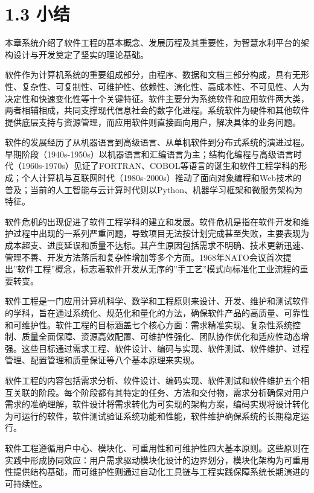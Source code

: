 \documentclass[12pt,a4paper]{ctexbook}
\begin{document}
\section{1.3 小结}\label{ux5c0fux7ed3}

本章系统介绍了软件工程的基本概念、发展历程及其重要性，为智慧水利平台的架构设计与开发奠定了坚实的理论基础。

软件作为计算机系统的重要组成部分，由程序、数据和文档三部分构成，具有无形性、复杂性、可复制性、可维护性、依赖性、演化性、高成本性、不可见性、人为决定性和快速变化性等十个关键特征。软件主要分为系统软件和应用软件两大类，两者相辅相成，共同支撑现代信息社会的数字化进程。系统软件为硬件和其他软件提供底层支持与资源管理，而应用软件则直接面向用户，解决具体的业务问题。

软件的发展经历了从机器语言到高级语言、从单机软件到分布式系统的演进过程。早期阶段（1940s-1950s）以机器语言和汇编语言为主；结构化编程与高级语言时代（1960s-1970s）见证了FORTRAN、COBOL等语言的诞生和软件工程学科的形成；个人计算机与互联网时代（1980s-2000s）推动了面向对象编程和Web技术的普及；当前的人工智能与云计算时代则以Python、机器学习框架和微服务架构为特征。

软件危机的出现促进了软件工程学科的建立和发展。软件危机是指在软件开发和维护过程中出现的一系列严重问题，导致项目无法按计划完成甚至失败，主要表现为成本超支、进度延误和质量不达标。其产生原因包括需求不明确、技术更新迅速、管理不善、开发方法落后和复杂性增加等多个方面。1968年NATO会议首次提出''软件工程''概念，标志着软件开发从无序的''手工艺''模式向标准化工业流程的重要转变。

软件工程是一门应用计算机科学、数学和工程原则来设计、开发、维护和测试软件的学科，旨在通过系统化、规范化和量化的方法，确保软件产品的高质量、可靠性和可维护性。软件工程的目标涵盖七个核心方面：需求精准实现、复杂性系统控制、质量全面保障、资源高效配置、可维护性强化、团队协作优化和适应性动态增强。这些目标通过需求工程、软件设计、编码与实现、软件测试、软件维护、过程管理、配置管理和质量保证等八个基本原理来实现。

软件工程的内容包括需求分析、软件设计、编码实现、软件测试和软件维护五个相互关联的阶段。每个阶段都有其特定的任务、方法和交付物，需求分析确保对用户需求的准确理解，软件设计将需求转化为可实现的架构方案，编码实现将设计转化为可运行的软件，软件测试验证系统功能和性能，软件维护确保系统的长期稳定运行。

软件工程遵循用户中心、模块化、可重用性和可维护性四大基本原则。这些原则在实践中形成协同效应：用户需求驱动模块化设计的边界划分，模块化架构为可重用性提供结构基础，而可维护性则通过自动化工具链与工程实践保障系统长期演进的可持续性。
\end{document}
